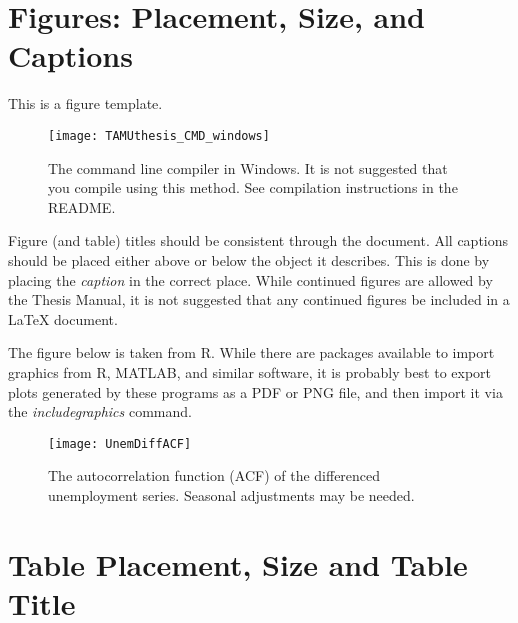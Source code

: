 %
%
%



\section{Figures: Placement, Size, and Captions}
This is a figure template.

\begin{figure}[!htb]
	\centering
	\texttt{[image: TAMUthesis\_CMD\_windows]}
	\caption[The command line compiler in Windows.]{The command line compiler in Windows. It is not suggested that you compile using this method. See compilation instructions in the README.}
	\label{fig:CMD_1}
\end{figure}

Figure (and table) titles should be consistent through the document. All captions should be placed either above or below the object it describes. This is done by placing the \textit{caption} in the correct place. While continued figures are allowed by the Thesis Manual, it is not suggested that any continued figures be included in a \LaTeX{} document.

The figure below is taken from R. While there are packages available to import graphics from R, MATLAB, and similar software, it is probably best to export plots generated by these programs as a PDF or PNG file, and then import it via the \textit{includegraphics} command.

\begin{figure}[!htb]
	\centering
	\texttt{[image: UnemDiffACF]}
	\caption{The autocorrelation function (ACF) of the differenced unemployment series. Seasonal adjustments may be needed.}
\end{figure}

\section{Table Placement, Size and Table Title}


